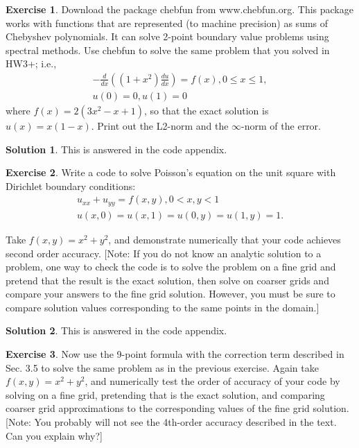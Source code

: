 \documentclass[12pt]{article}
\theoremstyle{definition}
\newtheorem{exer}{Exercise}
\newtheorem{sol}{Solution}
\theoremstyle{remark}
\begin{document}
\begin{exer}
Download the package chebfun from www.chebfun.org. This package works with functions that are represented (to machine precision) as sums of Chebyshev polynomials. It can solve 2-point boundary value problems using spectral methods. Use chebfun to solve the same problem that you solved in HW3+; i.e.,
\begin{align*}
    - \frac{d }{d x} \left(  (1+ x^{2}) \frac{d u}{d x}  \right ) = f(x), 0 \leq x \leq 1,\\
    u(0) = 0, u(1) = 0
\end{align*}
where $f (x) = 2(3x^2- x + 1)$, so that the exact solution is $u(x) = x(1 - x)$. Print out the L2-norm and the $\infty$-norm of the error.
\end{exer}

\begin{sol}
    This is answered in the code appendix. 
\end{sol}

\newpage

\begin{exer}
Write a code to solve Poisson’s equation on the unit square with Dirichlet boundary conditions:
\begin{align*}
    u_{xx} + u_{yy} = f(x,y), 0 < x, y < 1 \\
u(x,0) = u(x,1) = u(0, y) = u(1, y) = 1.
\end{align*}

Take $f(x,y) = x^2 + y^2$, and demonstrate numerically that your code achieves second order accuracy. [Note: If you do not know an analytic solution to a problem, one way to check the code is to solve the problem on a fine grid and pretend that the result is the exact solution, then solve on coarser grids and compare your answers to the fine grid solution. However, you must be sure to compare solution values corresponding to the same points in the domain.]
\end{exer}

\begin{sol}
This is answered in the code appendix.
\end{sol}

\newpage

\begin{exer}
 Now use the 9-point formula with the correction term described in Sec. 3.5 to solve the same problem as in the previous exercise. Again take $f(x,y) = x^2+y^2$, and numerically test the order of accuracy of your code by solving on a fine grid, pretending that is the exact solution, and comparing coarser grid approximations to the corresponding values of the fine grid solution. [Note: You probably will not see the 4th-order accuracy described in the text. Can you explain why?]
\end{exer}
\end{document}
